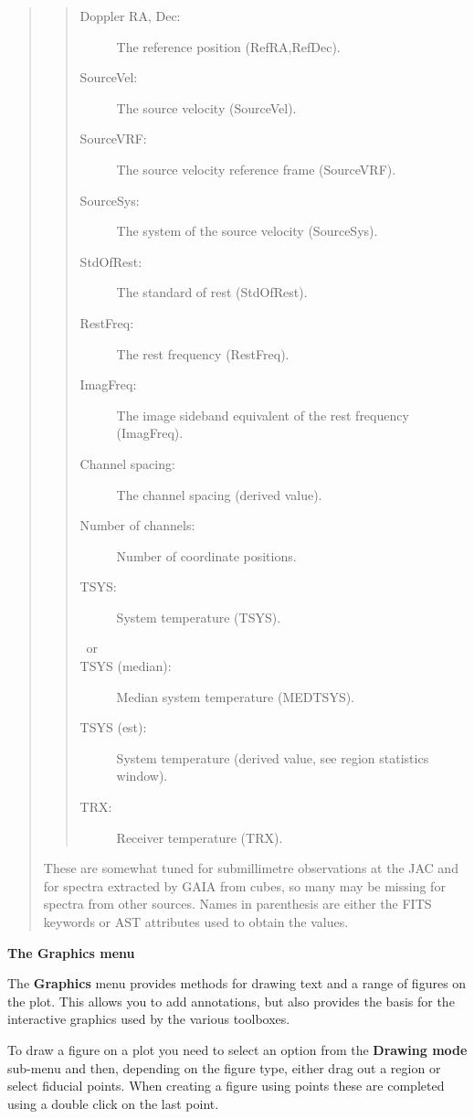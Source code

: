\documentclass[twoside,11pt]{article}
\renewcommand{\_}{\texttt{\symbol{95}}}
\newcommand{\menuitem}[1]{\textbf{#1}}
\newcommand{\subheading}[1]{\textbf{\large{#1}}}
\begin{document}
\begin{quote}
\begin{itemize}
\begin{quote}
\begin{description}
     \item[Doppler RA, Dec:] The reference position (RefRA,RefDec).
     \item[SourceVel:] The source velocity (SourceVel).
     \item[SourceVRF:] The source velocity reference frame (SourceVRF).
     \item[SourceSys:] The system of the source velocity (SourceSys).
     \item[StdOfRest:] The standard of rest (StdOfRest).
     \item[RestFreq:] The rest frequency (RestFreq).
     \item[ImagFreq:] The image sideband equivalent of the rest frequency (ImagFreq).
     \item[Channel spacing:] The channel spacing (derived value).
     \item[Number of channels:] Number of coordinate positions.
     \item[TSYS:] System temperature (TSYS).
     \item[~or]
     \item[TSYS (median):] Median system temperature (MEDTSYS).
     \item[TSYS (est):] System temperature (derived value, see region statistics window).
     \item[TRX:] Receiver temperature (TRX).
  \end{description}
  \end{quote}
  These are somewhat tuned for submillimetre observations at the JAC and for
  spectra extracted by GAIA from cubes, so many may be missing for spectra
  from other sources. Names in parenthesis are either the FITS keywords or
  AST attributes used to obtain the values.

 \end{itemize}
\end{quote}

\subheading{The Graphics menu}

The \menuitem{Graphics} menu provides methods for drawing text and a range of
figures on the plot. This allows you to add annotations, but also provides the
basis for the interactive graphics used by the various toolboxes.

To draw a figure on a plot you need to select an option from the
\menuitem{Drawing mode} sub-menu and then, depending on the figure type, either
drag out a region or select fiducial points. When creating a figure using
points these are completed using a double click on the last point.
\end{document}
